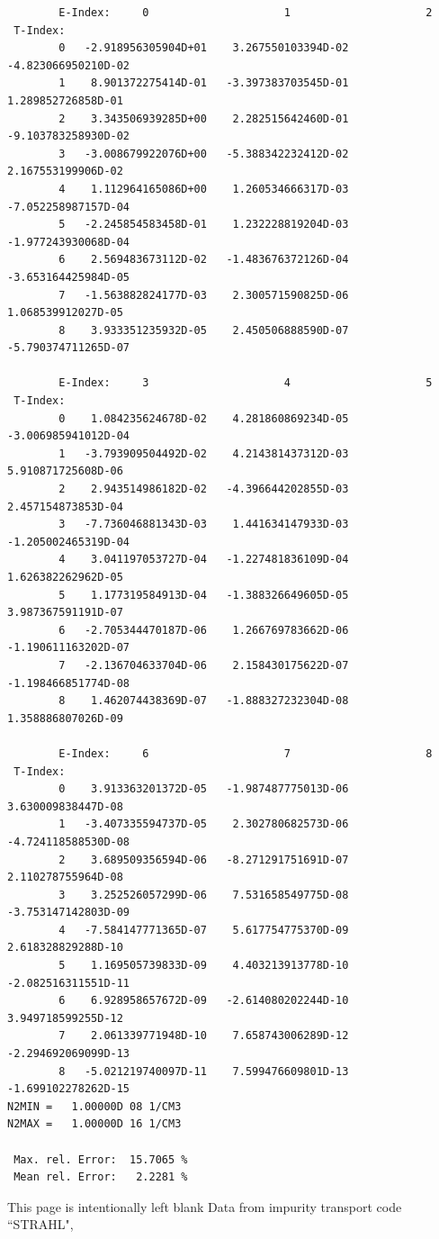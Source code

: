 \documentclass[12pt,dvipdfmx]{article}
\begin{document}
\begin{small}\begin{verbatim}
        E-Index:     0                     1                     2
 T-Index:
        0   -2.918956305904D+01    3.267550103394D-02   -4.823066950210D-02
        1    8.901372275414D-01   -3.397383703545D-01    1.289852726858D-01
        2    3.343506939285D+00    2.282515642460D-01   -9.103783258930D-02
        3   -3.008679922076D+00   -5.388342232412D-02    2.167553199906D-02
        4    1.112964165086D+00    1.260534666317D-03   -7.052258987157D-04
        5   -2.245854583458D-01    1.232228819204D-03   -1.977243930068D-04
        6    2.569483673112D-02   -1.483676372126D-04   -3.653164425984D-05
        7   -1.563882824177D-03    2.300571590825D-06    1.068539912027D-05
        8    3.933351235932D-05    2.450506888590D-07   -5.790374711265D-07

        E-Index:     3                     4                     5
 T-Index:
        0    1.084235624678D-02    4.281860869234D-05   -3.006985941012D-04
        1   -3.793909504492D-02    4.214381437312D-03    5.910871725608D-06
        2    2.943514986182D-02   -4.396644202855D-03    2.457154873853D-04
        3   -7.736046881343D-03    1.441634147933D-03   -1.205002465319D-04
        4    3.041197053727D-04   -1.227481836109D-04    1.626382262962D-05
        5    1.177319584913D-04   -1.388326649605D-05    3.987367591191D-07
        6   -2.705344470187D-06    1.266769783662D-06   -1.190611163202D-07
        7   -2.136704633704D-06    2.158430175622D-07   -1.198466851774D-08
        8    1.462074438369D-07   -1.888327232304D-08    1.358886807026D-09

        E-Index:     6                     7                     8
 T-Index:
        0    3.913363201372D-05   -1.987487775013D-06    3.630009838447D-08
        1   -3.407335594737D-05    2.302780682573D-06   -4.724118588530D-08
        2    3.689509356594D-06   -8.271291751691D-07    2.110278755964D-08
        3    3.252526057299D-06    7.531658549775D-08   -3.753147142803D-09
        4   -7.584147771365D-07    5.617754775370D-09    2.618328829288D-10
        5    1.169505739833D-09    4.403213913778D-10   -2.082516311551D-11
        6    6.928958657672D-09   -2.614080202244D-10    3.949718599255D-12
        7    2.061339771948D-10    7.658743006289D-12   -2.294692069099D-13
        8   -5.021219740097D-11    7.599476609801D-13   -1.699102278262D-15
N2MIN =   1.00000D 08 1/CM3
N2MAX =   1.00000D 16 1/CM3

 Max. rel. Error:  15.7065 %
 Mean rel. Error:   2.2281 %

\end{verbatim}\end{small}
\newpage
This page is intentionally left blank
\newpage
Data from impurity transport code ``STRAHL", \cite{kn:Behringer}
\end{document}
